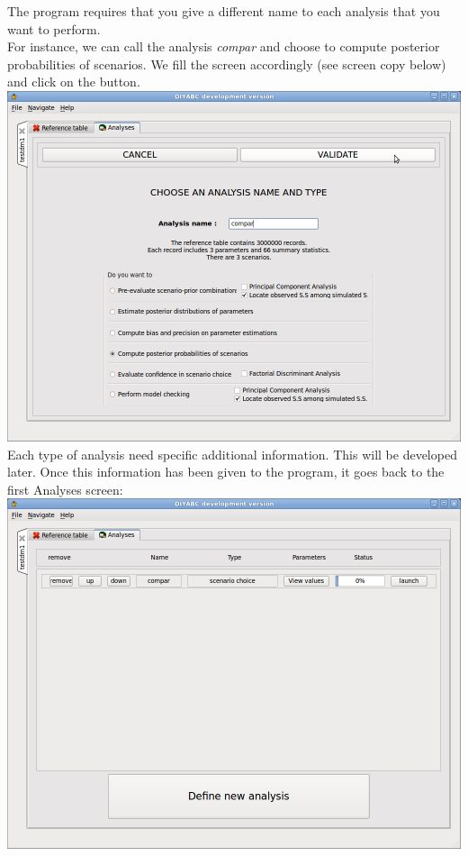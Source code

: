  \vspace{20}
The program requires that you give a different name to each analysis that you want to perform.\\
 For instance, we can call the analysis \emph{compar} and choose to compute posterior probabilities of scenarios. We fill the screen accordingly (see screen copy below) and click on the  button.\\
\includegraphics[scale=0.35]{gui_pictures/Capture-DIYABC-32.png} 
 \vspace{20}
Each type of analysis need specific additional information. This will be developed later. Once this information has been given to the program, it goes back to the first Analyses screen:\\
\includegraphics[scale=0.35]{gui_pictures/Capture-DIYABC-33.png} 
